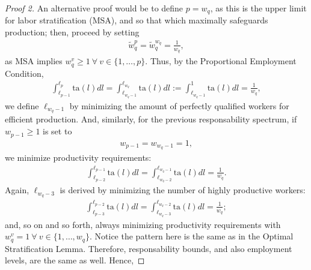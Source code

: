 \documentclass[hidelinks, nonatbib]{elsarticle}
\begin{document}
\begin{lemma}
    \begin{proof}[Proof 2]
        An alternative proof would be to define $p = w_q$, as this is the upper limit for labor stratification (MSA), and so that which maximally safeguards production; then, proceed by setting 
        \begin{gather}
        \tilde{w}_{q}^{p} 
        = 
        \tilde{w}_{q}^{w_q} 
        = 
        \frac{1}{w_q}
        ,
        \end{gather}
        as MSA implies $w_{q}^{v} \geq 1 \ \forall \ v \in \{1, \dots, p\}$. Thus, by the Proportional Employment Condition, 
        \begin{gather}
        \int_{
            \ell_{p-1}
        }^{
            \ell_{p}
        }{
            \text{ta}(l)dl
        }
        =
        \int_{
            \ell_{w_q-1}
        }^{
            \ell_{w_q}
        }{
            \text{ta}(l)dl
        }
        :=
        \int_{
            \ell_{w_q-1}
        }^{1}{
            \text{ta}(l)dl
        }
        =
        \frac{1}{w_q}
        ,
        \end{gather}
        we define $\ell_{w_q - 1}$ by minimizing the amount of perfectly qualified workers for efficient production. And, similarly, for the previous responsability spectrum, if $w_{p-1} \geq 1$ is set to 
        \begin{gather}
        w_{p-1} = w_{w_q - 1} = 1
        ,
        \end{gather}
        we minimize productivity requirements:
        \begin{gather}
        \int_{
            \ell_{p-2}
        }^{
            \ell_{p-1}
        }{
            \text{ta}(l)dl
        }
        =
        \int_{
            \ell_{w_q-2}
        }^{
            \ell_{w_q-1}
        }{
            \text{ta}(l)dl
        }
        =
        \frac{1}{w_q}
        .
        \end{gather}
        Again, $\ell_{w_q - 3}$ is derived by minimizing the number of highly productive workers:
        \begin{gather}
        \int_{
            \ell_{p-3}
        }^{
            \ell_{p-2}
        }{
            \text{ta}(l)dl
        }
        =
        \int_{
            \ell_{w_q-3}
        }^{
            \ell_{w_q-2}
        }{
            \text{ta}(l)dl
        }
        =
        \frac{1}{w_q}
        ;
        \end{gather}
        and, so on and so forth, always minimizing productivity requirements with $w_{q}^{v} = 1 \ \forall \ v \in \{1, \dots, w_q\}$. Notice the pattern here is the same as in the Optimal Stratification Lemma. Therefore, responsability bounds, and also employment levels, are the same as well. Hence,

\end{proof}
\end{lemma}
\end{document}
